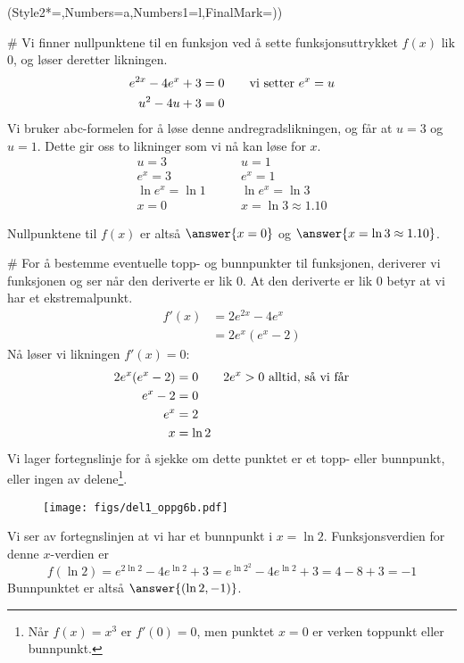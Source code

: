 \begin{easylist}[enumerate]
	\ListProperties(Style2*=,Numbers=a,Numbers1=l,FinalMark={)})
	
	# Vi finner nullpunktene til en funksjon ved å sette funksjonsuttrykket $f(x)$ lik $0$, og løser deretter likningen.
	\begin{align*}
		e^{2x} - 4e^{x} + 3 &= 0 \qquad \textnormal{vi setter $e^x = u$}\\ 
		u^2 - 4u + 3 &= 0
	\end{align*}
	Vi bruker abc-formelen for å løse denne andregradslikningen, og får at $u = 3$ og $u = 1$. Dette gir oss to likninger som vi nå kan løse for $x$.
	\begin{align*}
		u = 3 & \qquad u = 1 \\
		e^x = 3 & \qquad e^x = 1 \\
		\ln e^x = \ln 1 & \qquad \ln e^x = \ln 3\\
		x = 0 & \qquad x = \ln 3 \approx 1.10
	\end{align*}
	
	Nullpunktene til $f(x)$ er altså $	\answer{x = 0}$ og $\answer{x = \ln 3 \approx 1.10}$.
	
	# For å bestemme eventuelle topp- og bunnpunkter til funksjonen, deriverer vi funksjonen og ser når den deriverte er lik $0$. 
	At den deriverte er lik $0$ betyr at vi har et ekstremalpunkt.
	\begin{align*}
		f'(x) &= 2e^{2x} - 4e^x \\
		& = 2e^x(e^x - 2)
	\end{align*}
	Nå løser vi likningen $f'(x) = 0$:
	\begin{align*}
		2e^x(e^x - 2) & = 0 \qquad \textnormal{$2e^x > 0$ alltid, så vi får}\\
		e^x - 2 & = 0 \\
		e^x & = 2 \\
		x & = \ln 2
	\end{align*}
	Vi lager fortegnslinje for å sjekke om dette punktet er et topp- eller bunnpunkt, eller ingen av delene\footnote{Når $f(x) = x^3$ er $f'(0) = 0$, men punktet $x=0$ er verken toppunkt eller bunnpunkt.}.
	\begin{figure}[ht!]
		\centering
		\texttt{[image: figs/del1\_oppg6b.pdf]}
		\label{fig:del1_oppg6b}
	\end{figure}
	Vi ser av fortegnslinjen at vi har et bunnpunkt i $x = \ln 2$. Funksjonsverdien for denne $x$-verdien er
	\begin{equation*}
		f(\ln 2)  = e^{2\ln2} - 4e^{\ln 2} + 3 
		= e^{\ln 2^2} - 4e^{\ln 2} + 3  
		= 4 - 8 + 3 = -1
	\end{equation*}
	Bunnpunktet er altså $\answer{(\ln 2, -1)}$.
	

\end{easylist}
